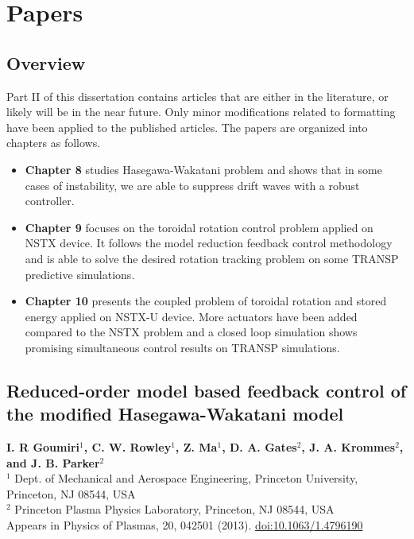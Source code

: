 \documentclass[12pt,lot, lof]{puthesis}
\begin{document}
\clearpage

\part{Papers}
\chapter{Overview}
Part II of this dissertation contains articles that are either in the literature, or likely will be in the near future. Only minor modifications related to formatting have been applied to the published articles. The papers are organized into chapters as follows.

\begin{itemize}
\item\textbf{Chapter 8} studies Hasegawa-Wakatani problem and shows that in some cases of instability, we are able to suppress drift waves with a robust controller.  
\item \textbf{Chapter 9} focuses on the toroidal rotation control problem applied on NSTX device. It follows the model reduction feedback control methodology and is able to solve the desired rotation tracking problem on some TRANSP predictive simulations.
\item \textbf{Chapter 10}  presents the coupled problem of toroidal rotation and stored energy applied on NSTX-U device. More actuators have been added compared to the NSTX problem and a closed loop simulation shows promising simultaneous control results on TRANSP simulations.
\end{itemize}

\chapter{Reduced-order model based feedback control of the modified Hasegawa-Wakatani model}
\label{chapter7}

\textbf{\large I. R Goumiri$^1$, C. W. Rowley$^1$, Z. Ma$^1$, D. A. Gates$^2$, J. A. Krommes$^2$, and J. B. Parker$^2$} \\
{\footnotesize $^1$ Dept. of Mechanical and Aerospace Engineering, Princeton University, Princeton, NJ 08544, USA \\[-0.4em]
$^2$ Princeton Plasma Physics Laboratory, Princeton, NJ 08544, USA} \\[1em]
%
{\footnotesize Appears in Physics of Plasmas, 20, 042501 (2013). \href{http://dx.doi.org/10.1063/1.4796190}{doi:10.1063/1.4796190}} \\[0.5em]
\end{document}
